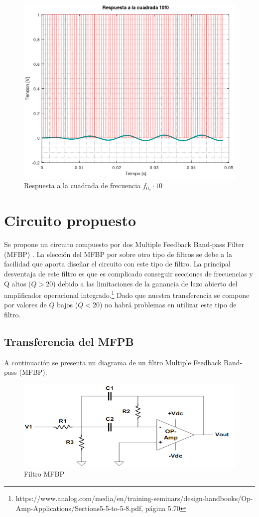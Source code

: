 \documentclass[11pt,a4paper]{report}
\begin{document}
\begin{figure}[ht!]
\includegraphics[scale=1]{RtaCuadradaWo23.png}
\caption{Respuesta a la cuadrada de frecuencia $f_{0_{2}} \cdot 10$}
\end{figure}


\section*{Circuito propuesto}

Se propone un circuito compuesto por dos Multiple Feedback Band-pass Filter (MFBP) . La elección del MFBP por sobre otro tipo de filtros se debe a la 
facilidad que aporta diseñar el circuito con este tipo de filtro. La principal
desventaja de este filtro es que es complicado conseguir secciones de frecuencias y Q altos ($Q > 20$) debido a las limitaciones de la ganancia de lazo abierto del amplificador operacional integrado.\footnote{https://www.analog.com/media/en/training-seminars/design-handbooks/Op-Amp-Applications/Sections5-5-to-5-8.pdf, página 5.70} Dado que nuestra transferencia se compone por valores de $Q$ bajos ($Q < 20$) no habrá problemas en utilizar este tipo de filtro.

\subsection*{Transferencia del MFPB}

A continuación se presenta un diagrama de un filtro Multiple Feedback Band-pass (MFBP).

\begin{figure}[h!]
\includegraphics[scale=0.9]{MFBP.png}
\caption{Filtro MFBP}
\end{figure}
\end{document}
